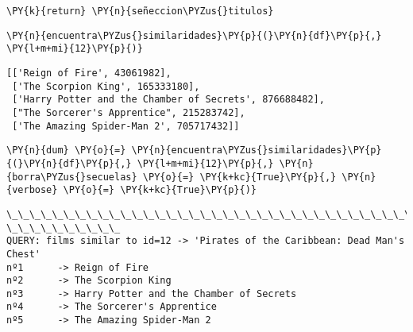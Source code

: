 \begin{tcolorbox}[breakable, size=fbox, boxrule=1pt, pad at break*=1mm,colback=cellbackground, colframe=cellborder]
\begin{Verbatim}[commandchars=\\\{\}]
    \PY{k}{return} \PY{n}{señeccion\PYZus{}titulos}
\end{Verbatim}
\end{tcolorbox}

    \begin{tcolorbox}[breakable, size=fbox, boxrule=1pt, pad at break*=1mm,colback=cellbackground, colframe=cellborder]
\begin{Verbatim}[commandchars=\\\{\}]
\PY{n}{encuentra\PYZus{}similaridades}\PY{p}{(}\PY{n}{df}\PY{p}{,} \PY{l+m+mi}{12}\PY{p}{)}
\end{Verbatim}
\end{tcolorbox}

            \begin{tcolorbox}[breakable, size=fbox, boxrule=.5pt, pad at break*=1mm, opacityfill=0]
\begin{Verbatim}[commandchars=\\\{\}]
[['Reign of Fire', 43061982],
 ['The Scorpion King', 165333180],
 ['Harry Potter and the Chamber of Secrets', 876688482],
 ["The Sorcerer's Apprentice", 215283742],
 ['The Amazing Spider-Man 2', 705717432]]
\end{Verbatim}
\end{tcolorbox}
        
    \begin{tcolorbox}[breakable, size=fbox, boxrule=1pt, pad at break*=1mm,colback=cellbackground, colframe=cellborder]
\begin{Verbatim}[commandchars=\\\{\}]
\PY{n}{dum} \PY{o}{=} \PY{n}{encuentra\PYZus{}similaridades}\PY{p}{(}\PY{n}{df}\PY{p}{,} \PY{l+m+mi}{12}\PY{p}{,} \PY{n}{borra\PYZus{}secuelas} \PY{o}{=} \PY{k+kc}{True}\PY{p}{,} \PY{n}{verbose} \PY{o}{=} \PY{k+kc}{True}\PY{p}{)}
\end{Verbatim}
\end{tcolorbox}

    \begin{Verbatim}[commandchars=\\\{\}]
\_\_\_\_\_\_\_\_\_\_\_\_\_\_\_\_\_\_\_\_\_\_\_\_\_\_\_\_\_\_\_\_\_\_\_\_\_\_\_\_\_\_\_\_\_\_\_\_\_\_\_\_\_\_\_\_\_\_\_\_\_\_\_\_\_\_\_\_\_\_\_\_\_\_\_\_\_\_\_\_
\_\_\_\_\_\_\_\_\_\_
QUERY: films similar to id=12 -> 'Pirates of the Caribbean: Dead Man's Chest'
nº1      -> Reign of Fire
nº2      -> The Scorpion King
nº3      -> Harry Potter and the Chamber of Secrets
nº4      -> The Sorcerer's Apprentice
nº5      -> The Amazing Spider-Man 2
    \end{Verbatim}

